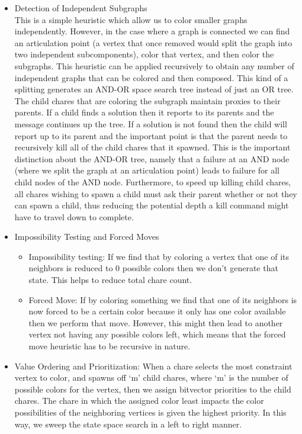 \documentclass[10pt,twoside]{article}
\begin{document}
\begin{itemize}
  \item Detection of Independent Subgraphs     \\
    This is a simple heuristic which allow us to color smaller graphs
    independently. However, in the case where a graph is connected we can find
    an articulation point (a vertex that once removed would split the graph
        into two independent subcomponents), color that vertex, and then color
    the subgraphs. This heuristic can be applied recursively to obtain any
    number of independent graphs that can be colored and then composed. This
    kind of a splitting generates an AND-OR space search tree instead of just
    an OR tree.  The child chares that are coloring the subgraph maintain
    proxies to their parents. If a child finds a solution then it reports to
    its parents and the message continues up the tree. If a solution is not
    found then the child will report up to its parent and the important point
    is that the parent needs to recursively kill all of the child chares that
    it spawned. This is the important distinction about the AND-OR tree, namely
    that a failure at an AND node (where we split the graph at an articulation
        point) leads to failure for all child nodes of the AND node.
    Furthermore, to speed up killing child chares, all chares wishing to spawn
    a child must ask their parent whether or not they can spawn a child, thus
    reducing the potential depth a kill command might have to travel down to
    complete.

  \item Impossibility Testing and Forced Moves
    \begin{itemize}
      \item Impossibility testing: If we find that by coloring a vertex that
        one of its neighbors is reduced to 0 possible colors then we don’t
        generate that state. This helps to reduce total chare count.  
        
      \item Forced Move: If by coloring something we find that one of its neighbors is now
        forced to be a certain color because it only has one color available
        then we perform that move. However, this might then lead to another
        vertex not having any possible colors left, which means that the forced
        move heuristic has to be recursive in nature.
    \end{itemize}      

  \item Value Ordering and Prioritization: When a chare selects the most
    constraint vertex to color, and spawns off ‘m’ child chares, where ‘m’ is
    the number of possible colors for the vertex, then we assign bitvector
    priorities to the child chares. The chare in which the assigned color least
    impacts the color possibilities of the neighboring vertices is given the
    highest priority. In this way, we sweep the state space search in a left to
    right manner.


\end{itemize}
\end{document}
